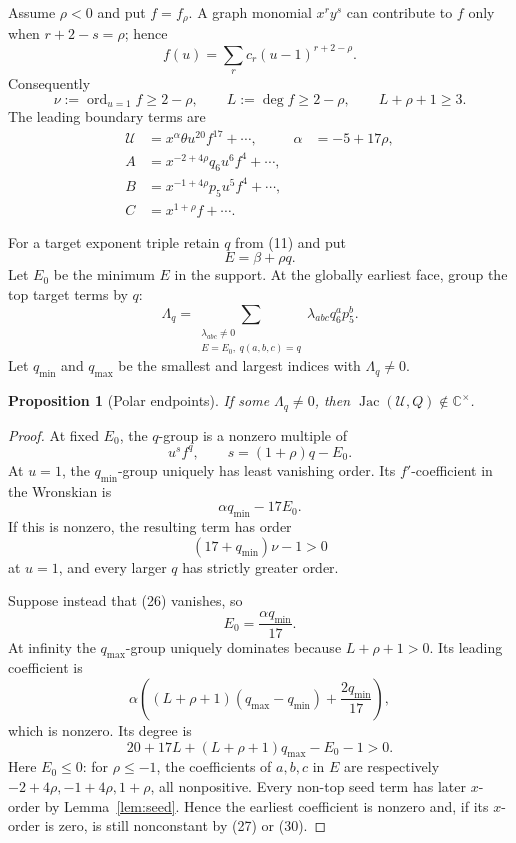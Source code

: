 \documentclass[11pt]{article}
\newtheorem{proposition}[theorem]{Proposition}
\theoremstyle{remark}
\newcommand{\C}{\mathbb C}
\newcommand{\Jac}{\operatorname{Jac}}
\newcommand{\ord}{\operatorname{ord}}
\newcommand{\cU}{\mathcal U}
\begin{document}
Assume \(\rho<0\) and put \(f=f_\rho\).  A graph monomial
\(x^ry^s\) can contribute to \(f\) only when \(r+2-s=\rho\);
hence
\[
f(u)=\sum_r c_r(u-1)^{r+2-\rho}.
\]
Consequently
\[
\nu:=\ord_{u=1}f\ge2-\rho,\qquad
L:=\deg f\ge2-\rho,\qquad
L+\rho+1\ge3.
\tag{21}
\]
The leading boundary terms are
\[
\begin{aligned}
\cU&=x^\alpha\theta u^{20}f^{17}+\cdots,
&\alpha&=-5+17\rho,\\
A&=x^{-2+4\rho}q_6u^6f^4+\cdots,\\
B&=x^{-1+4\rho}p_5u^5f^4+\cdots,\\
C&=x^{1+\rho}f+\cdots.
\end{aligned}
\tag{22}
\]

For a target exponent triple retain \(q\) from (11) and put
\[
E=\beta+\rho q.
\tag{23}
\]
Let \(E_0\) be the minimum \(E\) in the support.  At the
globally earliest face, group the top target terms by \(q\):
\[
\Lambda_q=
\sum_{\substack{\lambda_{abc}\ne0\\E=E_0,\ q(a,b,c)=q}}
\lambda_{abc}q_6^ap_5^b.
\tag{24}
\]
Let \(q_{\min}\) and \(q_{\max}\) be the smallest and largest
indices with \(\Lambda_q\ne0\).

\begin{proposition}[Polar endpoints]
\label{prop:polar}
If some \(\Lambda_q\ne0\), then
\(\Jac(\cU,Q)\notin\C^\times\).
\end{proposition}

\begin{proof}
At fixed \(E_0\), the \(q\)-group is a nonzero multiple of
\[
u^sf^q,\qquad s=(1+\rho)q-E_0.
\tag{25}
\]
At \(u=1\), the \(q_{\min}\)-group uniquely has least vanishing
order.  Its \(f'\)-coefficient in the Wronskian is
\[
\alpha q_{\min}-17E_0.
\tag{26}
\]
If this is nonzero, the resulting term has order
\[
(17+q_{\min})\nu-1>0
\tag{27}
\]
at \(u=1\), and every larger \(q\) has strictly greater order.

Suppose instead that (26) vanishes, so
\[
E_0=\frac{\alpha q_{\min}}{17}.
\tag{28}
\]
At infinity the \(q_{\max}\)-group uniquely dominates because
\(L+\rho+1>0\).  Its leading coefficient is
\[
\alpha\left(
(L+\rho+1)(q_{\max}-q_{\min})
+\frac{2q_{\min}}{17}
\right),
\tag{29}
\]
which is nonzero.  Its degree is
\[
20+17L+(L+\rho+1)q_{\max}-E_0-1>0.
\tag{30}
\]
Here \(E_0\le0\): for \(\rho\le-1\), the coefficients of
\(a,b,c\) in \(E\) are respectively
\(-2+4\rho,-1+4\rho,1+\rho\), all nonpositive.
Every non-top seed term has later \(x\)-order by
Lemma~\ref{lem:seed}.  Hence the earliest coefficient is nonzero
and, if its \(x\)-order is zero, is still nonconstant by (27) or
(30).
\end{proof}
\end{document}
